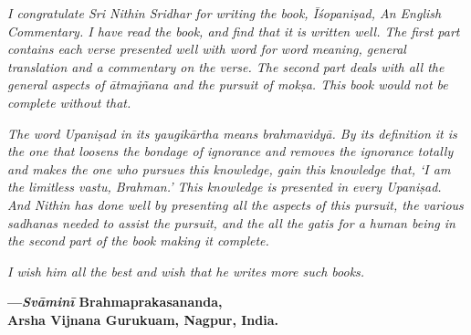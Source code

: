 \emph{I congratulate Sri Nithin Sridhar for writing the book, Īśopaniṣad, An English Commentary. I have read the book, and find that it is written well. The first part contains each verse presented well with word for word meaning, general translation and a commentary on the verse. The second part deals with all the general aspects of ātmajñana and the pursuit of mokṣa. This book would not be complete without that.}

\emph{The word Upaniṣad in its yaugikārtha means brahmavidyā. By its definition it is the one that loosens the bondage of ignorance and removes the ignorance totally and makes the one who pursues this knowledge, gain this knowledge that, `I am the limitless vastu, Brahman.' This knowledge is presented in every Upaniṣad. And Nithin has done well by presenting all the aspects of this pursuit, the various sadhanas needed to assist the pursuit, and the all the gatis for a human being in the second part of the book making it complete.}

\emph{I wish him all the best and wish that he writes more such books.}
\medskip

\begin{flushright}
\textbf{---\emph{Svāminī} Brahmaprakasananda,}\\
\textbf{Arsha Vijnana Gurukuam, Nagpur, India.}
\end{flushright}

